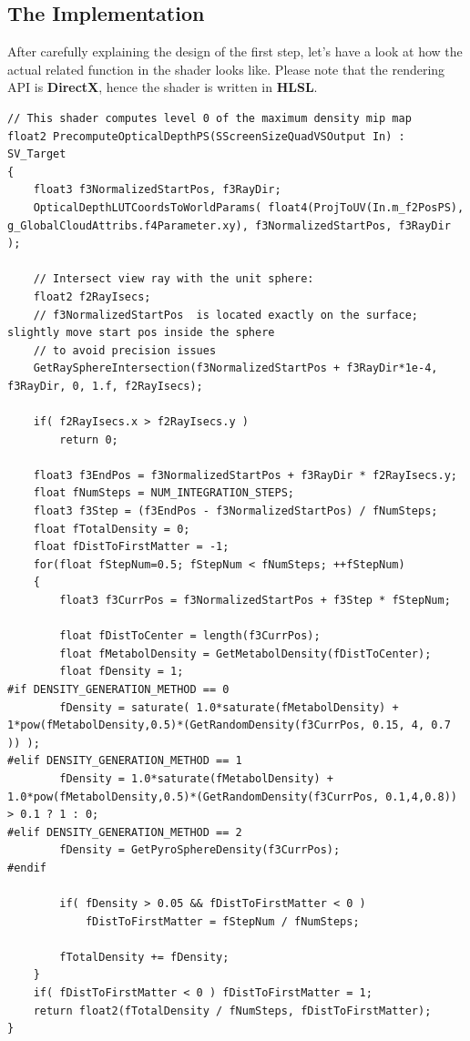 \subsection{The Implementation}
After carefully explaining the design of the first step, let's have a look at how the actual related function in the shader looks like. Please note that the rendering API is \textbf{DirectX}, hence the shader is written in \textbf{HLSL}.
\begin{lstlisting}
// This shader computes level 0 of the maximum density mip map
float2 PrecomputeOpticalDepthPS(SScreenSizeQuadVSOutput In) : SV_Target
{
    float3 f3NormalizedStartPos, f3RayDir;
    OpticalDepthLUTCoordsToWorldParams( float4(ProjToUV(In.m_f2PosPS), g_GlobalCloudAttribs.f4Parameter.xy), f3NormalizedStartPos, f3RayDir );
    
    // Intersect view ray with the unit sphere:
    float2 f2RayIsecs;
    // f3NormalizedStartPos  is located exactly on the surface; slightly move start pos inside the sphere
    // to avoid precision issues
    GetRaySphereIntersection(f3NormalizedStartPos + f3RayDir*1e-4, f3RayDir, 0, 1.f, f2RayIsecs);
    
    if( f2RayIsecs.x > f2RayIsecs.y )
        return 0;

    float3 f3EndPos = f3NormalizedStartPos + f3RayDir * f2RayIsecs.y;
    float fNumSteps = NUM_INTEGRATION_STEPS;
    float3 f3Step = (f3EndPos - f3NormalizedStartPos) / fNumSteps;
    float fTotalDensity = 0;
    float fDistToFirstMatter = -1;
    for(float fStepNum=0.5; fStepNum < fNumSteps; ++fStepNum)
    {
        float3 f3CurrPos = f3NormalizedStartPos + f3Step * fStepNum;
        
        float fDistToCenter = length(f3CurrPos);
        float fMetabolDensity = GetMetabolDensity(fDistToCenter);
        float fDensity = 1;
#if DENSITY_GENERATION_METHOD == 0
        fDensity = saturate( 1.0*saturate(fMetabolDensity) + 1*pow(fMetabolDensity,0.5)*(GetRandomDensity(f3CurrPos, 0.15, 4, 0.7 )) );
#elif DENSITY_GENERATION_METHOD == 1
        fDensity = 1.0*saturate(fMetabolDensity) + 1.0*pow(fMetabolDensity,0.5)*(GetRandomDensity(f3CurrPos, 0.1,4,0.8)) > 0.1 ? 1 : 0;
#elif DENSITY_GENERATION_METHOD == 2
        fDensity = GetPyroSphereDensity(f3CurrPos);
#endif

        if( fDensity > 0.05 && fDistToFirstMatter < 0 )
            fDistToFirstMatter = fStepNum / fNumSteps;
       
        fTotalDensity += fDensity;
    }
    if( fDistToFirstMatter < 0 ) fDistToFirstMatter = 1;
    return float2(fTotalDensity / fNumSteps, fDistToFirstMatter);
}
\end{lstlisting}


